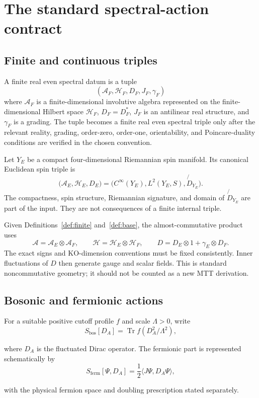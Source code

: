 \documentclass[11pt]{article}
\DeclareMathOperator{\Tr}{Tr}
\newcommand{\AF}{\mathcal{A}_F}
\newcommand{\HF}{\mathcal{H}_F}
\newcommand{\DF}{D_F}
\newcommand{\AlgE}{\mathcal{A}_E}
\newcommand{\HilbE}{\mathcal{H}_E}
\newcommand{\DirE}{D_E}
\begin{document}
\section{The standard spectral-action contract}

\subsection{Finite and continuous triples}

\begin{definition}\label{def:finite}
A finite real even spectral datum is a tuple
\[
  (\AF,\HF,\DF,J_F,\gamma_F)
\]
where $\AF$ is a finite-dimensional involutive algebra represented on the
finite-dimensional Hilbert space $\HF$, $\DF=\DF^\ast$, $J_F$ is an
antilinear real structure, and $\gamma_F$ is a grading.  The tuple becomes a
finite real even spectral triple only after the relevant reality, grading,
order-zero, order-one, orientability, and Poincare-duality conditions are
verified in the chosen convention.
\end{definition}

\begin{definition}\label{def:base}
Let $Y_E$ be a compact four-dimensional Riemannian spin manifold.  Its
canonical Euclidean spin triple is
\[
  \bigl(\AlgE,\HilbE,\DirE\bigr)
  =
  \bigl(C^\infty(Y_E),L^2(Y_E,S),\not{D}_{Y_E}\bigr).
\]
The compactness, spin structure, Riemannian signature, and domain of
$\not{D}_{Y_E}$ are part of the input.  They are not consequences of a finite
internal triple.
\end{definition}

Given Definitions~\ref{def:finite} and~\ref{def:base}, the
almost-commutative product uses
\[
 \mathcal{A}=\AlgE\otimes\AF,\qquad
 \mathcal{H}=\HilbE\otimes\HF,\qquad
 D=\DirE\otimes 1+\gamma_E\otimes\DF.
\]
The exact signs and KO-dimension conventions must be fixed consistently.
Inner fluctuations of $D$ then generate gauge and scalar fields.  This is
standard noncommutative geometry; it should not be counted as a new MTT
derivation.

\subsection{Bosonic and fermionic actions}

For a suitable positive cutoff profile $f$ and scale $\Lambda>0$, write
\begin{equation}\label{eq:spectral-action}
 S_{\mathrm{bos}}[D_A]
   =\Tr f(D_A^2/\Lambda^2),
\end{equation}
\par\smallskip\noindent
where $D_A$ is the fluctuated Dirac operator.  The fermionic part is represented
schematically by
\begin{equation}\label{eq:fermionic-action}
 S_{\mathrm{ferm}}[\Psi,D_A]
   =\frac12\langle J\Psi,D_A\Psi\rangle ,
\end{equation}
\par\smallskip\noindent
with the physical fermion space and doubling prescription stated separately.
\end{document}
